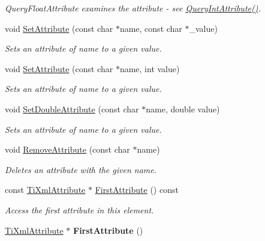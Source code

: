 \begin{DoxyCompactItemize}
\begin{DoxyCompactList}\small\item\em Query\+Float\+Attribute examines the attribute -\/ see \hyperlink{class_ti_xml_element_aea0bfe471380f281c5945770ddbf52b9}{Query\+Int\+Attribute()}. \end{DoxyCompactList}\item 
void \hyperlink{class_ti_xml_element_abf0b3bd7f0e4c746a89ec6e7f101fc32}{Set\+Attribute} (const char $\ast$name, const char $\ast$\+\_\+value)
\begin{DoxyCompactList}\small\item\em Sets an attribute of name to a given value. \end{DoxyCompactList}\item 
void \hyperlink{class_ti_xml_element_ace6f4be75e373726d4774073d666d1a7}{Set\+Attribute} (const char $\ast$name, int value)
\begin{DoxyCompactList}\small\item\em Sets an attribute of name to a given value. \end{DoxyCompactList}\item 
void \hyperlink{class_ti_xml_element_a0d1dd975d75496778177e35abfe0ec0b}{Set\+Double\+Attribute} (const char $\ast$name, double value)
\begin{DoxyCompactList}\small\item\em Sets an attribute of name to a given value. \end{DoxyCompactList}\item 
void \hyperlink{class_ti_xml_element_a56979767deca794376b1dfa69a525b2a}{Remove\+Attribute} (const char $\ast$name)\hypertarget{class_ti_xml_element_a56979767deca794376b1dfa69a525b2a}{}\label{class_ti_xml_element_a56979767deca794376b1dfa69a525b2a}

\begin{DoxyCompactList}\small\item\em Deletes an attribute with the given name. \end{DoxyCompactList}\item 
const \hyperlink{class_ti_xml_attribute}{Ti\+Xml\+Attribute} $\ast$ \hyperlink{class_ti_xml_element_a516054c9073647d6cb29b6abe9fa0592}{First\+Attribute} () const \hypertarget{class_ti_xml_element_a516054c9073647d6cb29b6abe9fa0592}{}\label{class_ti_xml_element_a516054c9073647d6cb29b6abe9fa0592}

\begin{DoxyCompactList}\small\item\em Access the first attribute in this element. \end{DoxyCompactList}\item 
\hyperlink{class_ti_xml_attribute}{Ti\+Xml\+Attribute} $\ast$ {\bfseries First\+Attribute} ()\hypertarget{class_ti_xml_element_a4b33780fc565d38d6b54f640e0cf1737}{}\label{class_ti_xml_element_a4b33780fc565d38d6b54f640e0cf1737}


\end{DoxyCompactItemize}
